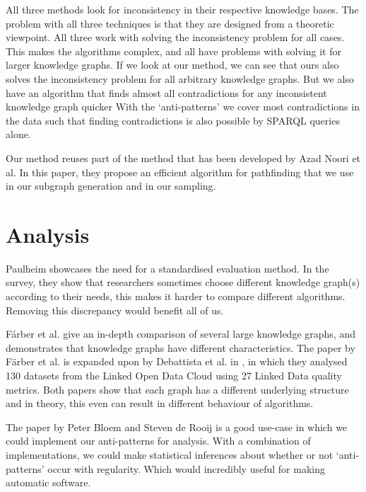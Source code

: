 \documentclass[11pt,letterpaper ,oneside ]{book}
\begin{document}
	All three methods look for inconsistency in their respective knowledge bases. The problem with all three techniques is that they are designed from a theoretic viewpoint. All three work with solving the inconsistency problem for all cases. This makes the algorithms complex, and all have problems with solving it for larger knowledge graphs. If we look at our method, we can see that ours also solves the inconsistency problem for all arbitrary knowledge graphs. But we also have an algorithm that finds almost all contradictions for any inconsistent knowledge graph quicker With the `anti-patterns' we cover most contradictions in the data such that finding contradictions is also possible by SPARQL queries alone.
	
	Our method reuses part of the method that has been developed by Azad Noori et al\cite{Noori:2015}. In this paper, they propose an efficient algorithm for pathfinding that we use in our subgraph generation and in our sampling.
	
	\section{Analysis}
	Paulheim \cite{HeikoP:2016} showcases the need for a standardised evaluation method. In the survey, they show that researchers sometimes choose different knowledge graph(s) according to their needs, this makes it harder to compare different algorithms. Removing this discrepancy would benefit all of us.
	
	F\'arber et al. \cite{MichaelF:2017} give an in-depth comparison of several large knowledge graphs, and demonstrates that knowledge graphs have different characteristics. The paper by F\"arber et al. \cite{MichaelF:2017} is expanded upon by Debattista et al. in \cite{Debattista:2018}, in which they analysed 130 datasets from the Linked Open Data Cloud using 27 Linked Data quality metrics. Both papers show that each graph has a different underlying structure and in theory, this even can result in different behaviour of algorithms.
	
	The paper by Peter Bloem and Steven de Rooij\cite{BloemP:2018} is a good use-case in which we could implement our anti-patterns for analysis. With a combination of implementations, we could make statistical inferences about whether or not `anti-patterns' occur with regularity. Which would incredibly useful for making automatic software.
	
\end{document}
